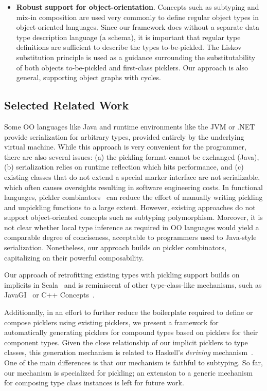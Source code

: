 \begin{itemize}
\item {\bf Robust support for object-orientation}. Concepts such as subtyping
and mix-in composition are used very commonly to define
regular object types in object-oriented languages. Since our framework does
without a separate data type description language (\eg a schema), it
is important that regular type definitions are sufficient to describe the
types to-be-pickled. The Liskov substitution principle is used as a guidance
surrounding the substitutability of both objects to-be-pickled and first-class
picklers. Our approach is also general, supporting object graphs with cycles.
\end{itemize}


\subsection{Selected Related Work}

Some OO languages like Java and runtime environments like the JVM or
.NET provide serialization for arbitrary types, provided entirely by
the underlying virtual machine. While this approach is very convenient
for the programmer, there are also several issues: (a) the pickling
format cannot be exchanged (Java), (b) serialization relies on runtime
reflection which hits performance, and (c) existing classes that do
not extend a special marker interface are not serializable, which
often causes oversights resulting in software engineering costs. In
functional languages, pickler
combinators~\cite{Kennedy2004,Elsman2005} can reduce the effort of
manually writing pickling and unpickling functions to a large
extent. However, existing approaches do not support object-oriented
concepts such as subtyping polymorphism. Moreover, it is not clear
whether local type inference as required in OO languages would yield a
comparable degree of conciseness, acceptable to programmers used to
Java-style serialization.  Nonetheless, our approach builds on pickler
combinators, capitalizing on their powerful composability.

Our approach of retrofitting existing types with pickling support
builds on implicits in Scala~\cite{Oliveira2010} and is reminiscent of
other type-class-like mechanisms, such as JavaGI~\cite{WehrT11} or C++
Concepts~\cite{ReisS06}.

Additionally, in an effort to further reduce the boilerplate required
to define or compose picklers using existing picklers, we present a
framework for automatically generating picklers for compound types
based on picklers for their component types. Given the close
relationship of our implicit picklers to type classes, this generation
mechanism is related to Haskell's {\em deriving}
mechanism~\cite{MagalhaesDJL10}. One of the main differences is that
our mechanism is faithful to subtyping. So far, our mechanism is
specialized for pickling; an extension to a generic mechanism for
composing type class instances is left for future work.


